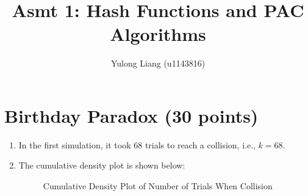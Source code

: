 \documentclass[11pt]{article}
\title{Asmt 1: Hash Functions and PAC Algorithms}
\author{Yulong Liang (u1143816)}
\begin{document}
\maketitle


\section{Birthday Paradox (30 points)}

\begin{enumerate}[A]
\item In the first simulation, it took 68 trials to reach a collision, i.e., $k = 68$.
\item The cumulative density plot is shown below:
\begin{figure}[h]
\caption{Cumulative Density Plot of Number of Trials When Collision}
\label{fig:name}
\end{figure}


\end{enumerate}
\end{document}
